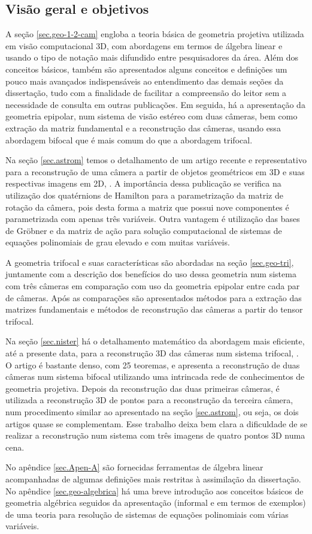 \subsection*{Visão geral e objetivos}

A seção \ref{sec.geo-1-2-cam} engloba a teoria básica de geometria projetiva utilizada em visão computacional 3D, com abordagens em termos de álgebra linear e usando o tipo de notação mais difundido entre pesquisadores da área. Além dos conceitos básicos, também são apresentados alguns conceitos e definições um pouco mais avançados indispensáveis ao entendimento das demais seções da dissertação, tudo com a finalidade de facilitar a compreensão do leitor sem a necessidade de consulta em outras publicações. Em seguida, há a apresentação da geometria epipolar, num sistema de visão estéreo com duas câmeras, bem como extração da matriz fundamental e a reconstrução das câmeras, usando essa abordagem bifocal que é mais comum do que a abordagem trifocal.

Na seção \ref{sec.astrom} temos o detalhamento de um artigo recente e representativo para a reconstrução de uma câmera a partir de objetos geométricos em 3D e suas respectivas imagens em 2D, \citep{bib:kuang}. A importância dessa publicação se verifica na utilização dos quatérnions de Hamilton para a parametrização da matriz de rotação da câmera, pois desta forma a matriz que possui nove componentes é parametrizada com apenas três variáveis. Outra vantagem é utilização das bases de Gr\"obner e da matriz de ação para solução computacional de sistemas de equações polinomiais de grau elevado e com muitas variáveis.

A geometria trifocal e suas características são abordadas na seção \ref{sec.geo-tri}, juntamente com a descrição dos benefícios do uso dessa geometria num sistema com três câmeras em comparação com uso da geometria epipolar entre cada par de câmeras. Após as comparações são apresentados métodos para a extração das matrizes fundamentais e métodos de reconstrução das câmeras a partir do tensor trifocal.  

Na seção \ref{sec.nister} há o detalhamento matemático da abordagem mais eficiente, até a presente data, para a reconstrução 3D das câmeras num sistema trifocal, \citep{2503343}. O artigo é bastante denso, com 25 teoremas, e apresenta a reconstrução de duas câmeras num sistema bifocal utilizando uma intrincada rede de conhecimentos de geometria projetiva. Depois da reconstrução das duas primeiras câmeras, é utilizada a reconstrução 3D de pontos para a reconstrução da terceira câmera, num procedimento similar ao apresentado na seção \ref{sec.astrom}, ou seja, os dois artigos quase se complementam. Esse trabalho deixa bem clara a dificuldade de se realizar a reconstrução num sistema com três imagens de quatro pontos 3D numa cena.

No apêndice \ref{sec.Apen-A} são fornecidas ferramentas de álgebra linear acompanhadas de algumas definições mais restritas à assimilação da dissertação. No apêndice \ref{sec.geo-algebrica} há uma breve introdução aos conceitos básicos de geometria algébrica seguidos da apresentação (informal e em termos de exemplos) de uma teoria para resolução de sistemas de equações polinomiais com várias variáveis.

